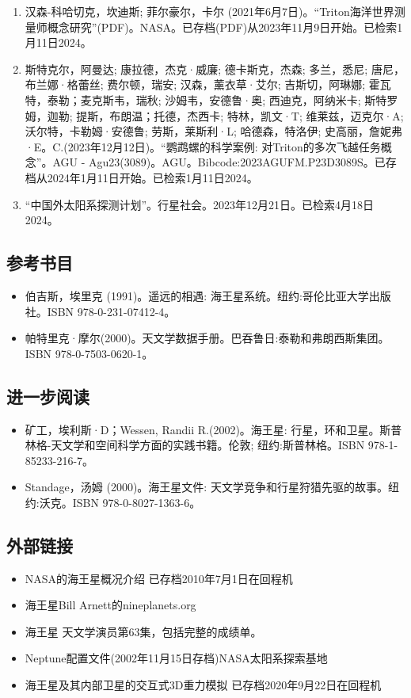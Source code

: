 \begin{enumerate}
\item 汉森-科哈切克，坎迪斯; 菲尔豪尔，卡尔 (2021年6月7日)。“Triton海洋世界测量师概念研究”(PDF)。NASA。已存档(PDF)从2023年11月9日开始。已检索1月11日2024。
\item 斯特克尔，阿曼达; 康拉德，杰克·威廉; 德卡斯克，杰森; 多兰，悉尼; 唐尼，布兰娜·格蕾丝; 费尔顿，瑞安; 汉森，薰衣草·艾尔; 吉斯切，阿琳娜; 霍瓦特，泰勒；麦克斯韦，瑞秋; 沙姆韦，安德鲁·奥; 西迪克，阿纳米卡; 斯特罗姆，迦勒; 提斯，布朗温；托德，杰西卡; 特林，凯文·T; 维莱兹，迈克尔·A; 沃尔特，卡勒姆·安德鲁; 劳斯，莱斯利·L; 哈德森，特洛伊; 史高丽，詹妮弗·E。C.(2023年12月12日)。“鹦鹉螺的科学案例: 对Triton的多次飞越任务概念”。AGU - Agu23(3089)。AGU。Bibcode:2023AGUFM.P23D3089S。已存档从2024年1月11日开始。已检索1月11日2024。
\item “中国外太阳系探测计划”。行星社会。2023年12月21日。已检索4月18日2024。
\end{enumerate}
\subsection{参考书目}
\begin{itemize}
\item 伯吉斯，埃里克 (1991)。遥远的相遇: 海王星系统。纽约:哥伦比亚大学出版社。ISBN 978-0-231-07412-4。
\item 帕特里克·摩尔(2000)。天文学数据手册。巴吞鲁日:泰勒和弗朗西斯集团。ISBN 978-0-7503-0620-1。
\end{itemize}
\subsection{进一步阅读}
\begin{itemize}
\item 矿工，埃利斯·D；Wessen, Randii R.(2002)。海王星: 行星，环和卫星。斯普林格-天文学和空间科学方面的实践书籍。伦敦; 纽约:斯普林格。ISBN 978-1-85233-216-7。
\item Standage，汤姆 (2000)。海王星文件: 天文学竞争和行星狩猎先驱的故事。纽约:沃克。ISBN 978-0-8027-1363-6。
\end{itemize}
\subsection{外部链接}

\begin{itemize}
\item NASA的海王星概况介绍 已存档2010年7月1日在回程机
\item 海王星Bill Arnett的nineplanets.org
\item 海王星 天文学演员第63集，包括完整的成绩单。
\item Neptune配置文件(2002年11月15日存档)NASA太阳系探索基地
\item 海王星及其内部卫星的交互式3D重力模拟 已存档2020年9月22日在回程机
\end{itemize}